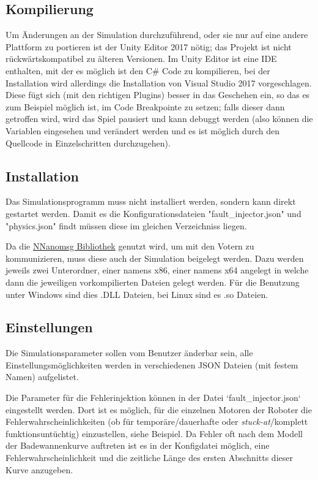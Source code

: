 \documentclass[
    12pt,
    bibliography=totoc,
    ngerman,
    enabledeprecatedfontcommands
]{scrartcl}
\begin{document}
\subsection{Kompilierung}
Um {\"{A}}nderungen an der Simulation durchzuf{\"{u}}hrend, oder sie nur auf eine andere Plattform
zu portieren ist der Unity Editor 2017 n{\"{o}}tig; das Projekt ist nicht r{\"{u}}ckw{\"{a}}rtskompatibel zu {\"{a}}lteren Versionen. Im Unity Editor
ist eine IDE enthalten, mit der es m{\"{o}}glich ist den C\# Code zu kompilieren, bei der Installation wird allerdings die Installation von Visual Studio
2017 vorgeschlagen. Diese f{\"{u}}gt sich (mit den richtigen Plugins) besser in das Geschehen ein, so das es zum Beispiel m{\"{o}}glich ist, im Code
Breakpointe zu setzen; falls dieser dann getroffen wird, wird das Spiel pausiert und kann debuggt werden (also k{\"{o}}nnen die Variablen eingesehen
und ver{\"{a}}ndert werden und es ist m{\"{o}}glich durch den Quellcode in Einzelschritten durchzugehen).


\subsection{Installation}
Das Simulationsprogramm muss nicht installiert werden, sondern kann direkt gestartet werden. Damit es die Konfigurationsdateien "fault\_injector.json" und
"physics.json" findt m{\"{u}}ssen diese im gleichen Verzeichniss liegen.

Da die \href{https://github.com/mhowlett/NNanomsg}{NNanomsg Bibliothek} genutzt wird, um mit den Votern zu kommunizieren, muss diese auch der Simulation beigelegt werden. 
Dazu werden jeweils zwei Unterordner, einer namens x86, einer namens x64 angelegt in welche dann die jeweiligen vorkompilierten Dateien gelegt werden. F{\"{u}}r die
Benutzung unter Windows sind dies .DLL Dateien, bei Linux sind es .so Dateien.

\subsection{Einstellungen}
Die Simulationsparameter sollen vom Benutzer {\"{a}}nderbar sein, alle Einstellungsm{\"{o}}glichkeiten werden in verschiedenen JSON Dateien (mit festem Namen) aufgelistet.

Die Parameter f{\"{u}}r die Fehlerinjektion k{\"{o}}nnen in der Datei `fault\_injector.json` eingestellt werden. Dort ist es m{\"{o}}glich, f{\"{u}}r die einzelnen Motoren
der Roboter die Fehlerwahrscheinlichkeiten (ob f{\"{u}}r tempor{\"{a}}re/dauerhafte oder \textit{stuck-at}/komplett funktionsunt{\"{u}}chtig) einzustellen, siehe
Beispiel. Da Fehler oft nach dem Modell der Badewannenkurve auftreten ist es in der Konfigdatei m{\"{o}}glich, eine Fehlerwahrscheinlichkeit und die zeitliche L{\"{a}}nge
des ersten Abschnitts dieser Kurve anzugeben.

\end{document}
